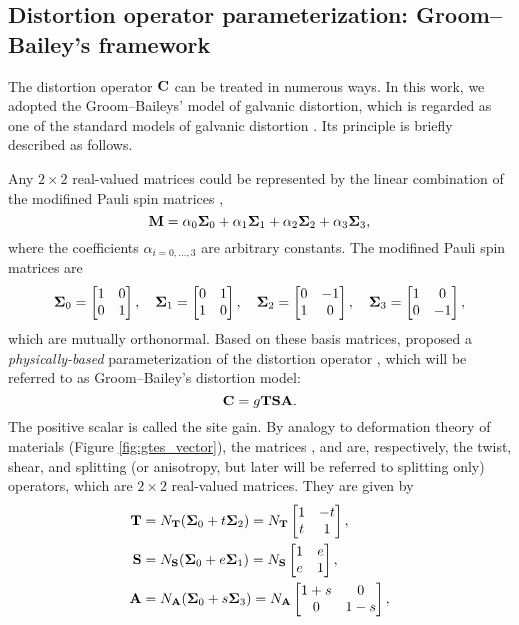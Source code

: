 	\subsection[Groom--Bailey's framework]{Distortion operator parameterization: Groom--Bailey's framework}
		 The distortion operator $\mathbf{C}$ can be treated in numerous ways. In this work, we adopted the Groom--Baileys' model of galvanic distortion, which is regarded as one of the standard models of galvanic distortion 
\citep[e.g.,][]{ chave1994a, mcneice2001a, chave2012a}.
		Its principle is briefly described as follows.

		 Any $2\times2$ real-valued matrices {\Mbf} could be represented by the linear combination of the modifined Pauli spin matrices \citep{spitz1985a},
		\begin{equation}
			\mathbf{M} = \alpha_0\mathbf{\Sigma}_0+\alpha_1\mathbf{\Sigma}_1+\alpha_2\mathbf{\Sigma}_2 + \alpha_3\mathbf{\Sigma}_3,
		\end{equation}
		where the coefficients $\alpha_{i=0,...,3}$ are arbitrary constants. The modifined Pauli spin matrices are
		\begin{equation}
			\mathbf{\Sigma}_0=\begin{bmatrix} 1 & 0 \\ 0 & 1\end{bmatrix}, \quad
			\mathbf{\Sigma}_1=\begin{bmatrix} 0 & 1 \\ 1 & 0\end{bmatrix}, \quad
			\mathbf{\Sigma}_2=\begin{bmatrix} 0 & -1 \\ 1 & 0\end{bmatrix}, \quad
			\mathbf{\Sigma}_3=\begin{bmatrix} 1 & 0 \\ 0 & -1\end{bmatrix},
		\end{equation}
		which are mutually orthonormal. Based on these basis matrices,
		\citet{groom1989a} proposed a \emph{physically-based} parameterization of the distortion operator \Cbf, which will be referred to as Groom--Bailey's distortion model:
		\begin{equation}\label{eq:c_gtsa}
			\Cbf = \gain\Tbf\Sbf\Abf.
		\end{equation}
		The positive scalar {\gain} is called the site gain.
		By analogy to deformation theory of materials (Figure \ref{fig:gtes_vector}), the matrices {\Tbf}, {\Sbf} and {\Abf} are, respectively, the twist, shear, and splitting (or anisotropy, but later will be referred to splitting only) operators, which are $2\times2$ real-valued matrices. 
		They are given by
		\begin{equation}\label{eq:TSA_def}
			\begin{split}
				\Tbf & = \NT(\SigmaZero+\twistp\SigmaTwo) = \NT\Tmatrix, \\
				\Sbf & = \NS(\SigmaZero+\shearp\SigmaOne) = \NS\Smatrix, \\
				\Abf & = \NA(\SigmaZero+\splittingp\SigmaThree)  = \NA\Amatrix, \\
			\end{split}
		\end{equation}
